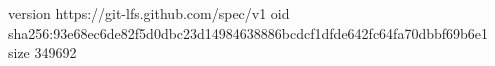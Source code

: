 version https://git-lfs.github.com/spec/v1
oid sha256:93e68ec6de82f5d0dbc23d14984638886bcdcf1dfde642fc64fa70dbbf69b6e1
size 349692
